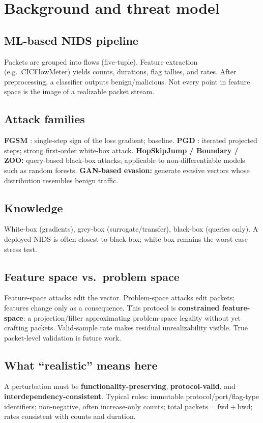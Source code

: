 \documentclass[11pt,a4paper]{article}
\begin{document}
\section{Background and threat model}

\subsection{ML-based NIDS pipeline}
Packets are grouped into flows (five-tuple). Feature extraction (e.g.\ CICFlowMeter) yields counts, durations, flag tallies, and rates. After preprocessing, a classifier outputs benign/malicious. Not every point in feature space is the image of a realizable packet stream.

\subsection{Attack families}
\textbf{FGSM} \cite{goodfellow2015explaining}: single-step sign of the loss gradient; baseline.
\textbf{PGD} \cite{madry2018towards}: iterated projected steps; strong first-order white-box attack.
\textbf{HopSkipJump / Boundary / ZOO:} query-based black-box attacks; applicable to non-differentiable models such as random forests.
\textbf{GAN-based evasion:} generate evasive vectors whose distribution resembles benign traffic.

\subsection{Knowledge}
White-box (gradients), grey-box (surrogate/transfer), black-box (queries only). A deployed NIDS is often closest to black-box; white-box remains the worst-case stress test.

\subsection{Feature space vs.\ problem space}
Feature-space attacks edit the vector. Problem-space attacks edit packets; features change only as a consequence. This protocol is \textbf{constrained feature-space}: a projection/filter approximating problem-space legality without yet crafting packets. Valid-sample rate makes residual unrealizability visible. True packet-level validation is future work.

\subsection{What ``realistic'' means here}
A perturbation must be \textbf{functionality-preserving}, \textbf{protocol-valid}, and \textbf{interdependency-consistent}. Typical rules: immutable protocol/port/flag-type identifiers; non-negative, often increase-only counts; $\mathrm{total\_packets}=\mathrm{fwd}+\mathrm{bwd}$; rates consistent with counts and duration.
\end{document}
